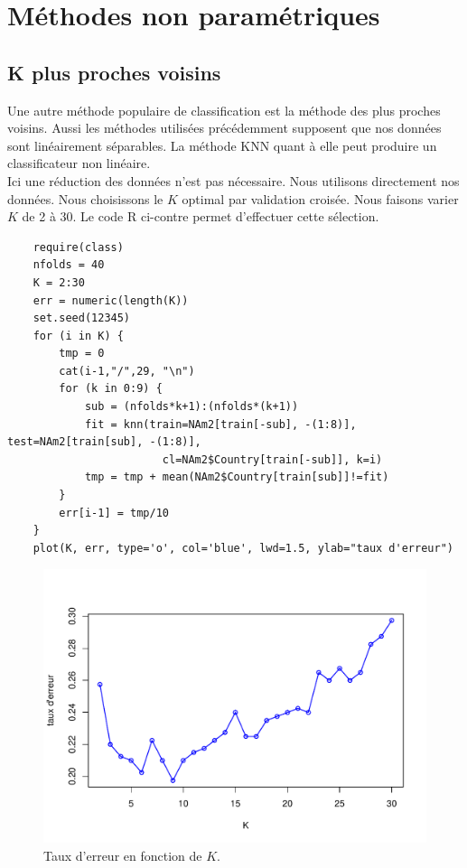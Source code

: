 \documentclass[12pt,a4paper]{article}
\begin{document}
\section{Méthodes non paramétriques}
\subsection{K plus proches voisins}
Une autre méthode populaire de classification est la méthode des plus proches voisins. Aussi les méthodes utilisées précédemment supposent que nos données sont linéairement séparables. La méthode KNN quant à elle peut produire un classificateur non linéaire.\vspace{3mm}\\
Ici une réduction des données n'est pas nécessaire. Nous utilisons directement nos données. Nous choisissons le $K$ optimal par validation croisée. Nous faisons varier $K$ de 2 à 30. Le code R ci-contre permet d'effectuer cette sélection.\vspace{2mm}
\begin{lstlisting}
	require(class)
	nfolds = 40
	K = 2:30
	err = numeric(length(K))
	set.seed(12345)
	for (i in K) {
		tmp = 0
		cat(i-1,"/",29, "\n")
		for (k in 0:9) {
			sub = (nfolds*k+1):(nfolds*(k+1))
			fit = knn(train=NAm2[train[-sub], -(1:8)], test=NAm2[train[sub], -(1:8)],
						cl=NAm2$Country[train[-sub]], k=i)
			tmp = tmp + mean(NAm2$Country[train[sub]]!=fit)
		}
		err[i-1] = tmp/10
	}
	plot(K, err, type='o', col='blue', lwd=1.5, ylab="taux d'erreur")
\end{lstlisting}
\begin{figure}[h!]
	\begin{center}
		\includegraphics[scale=0.5]{figures/kopt.pdf}
		\caption{Taux d'erreur en fonction de $K$.}
		\label{fig:kopt}
	\end{center}
\end{figure}
\end{document}
